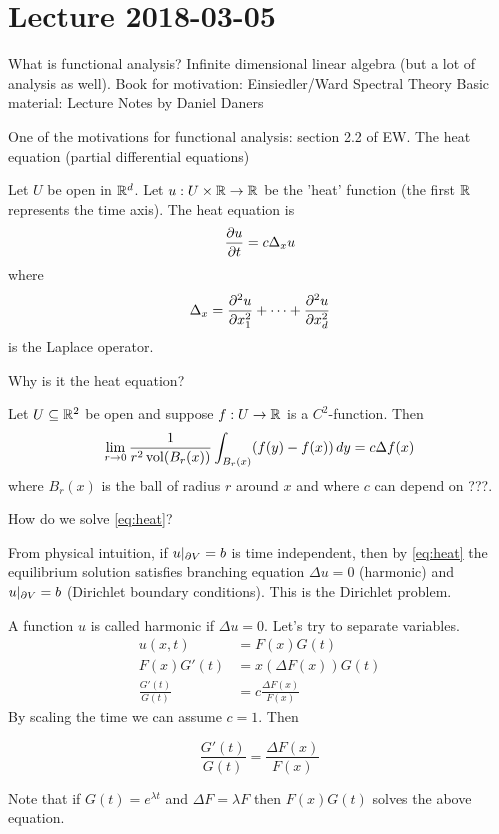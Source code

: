 \section{Lecture 2018-03-05}

What is functional analysis? Infinite dimensional linear algebra (but a lot of analysis as well).
Book for motivation: Einsiedler/Ward Spectral Theory
Basic material: Lecture Notes by Daniel Daners

One of the motivations for functional analysis: section 2.2 of EW.
The heat equation (partial differential equations)

\begin{defn}
	Let $U$ be open in $\mathbb{R}^d$.
	Let $u: U \times \mathbb{R} \to \mathbb{R}$ be the 'heat' function (the first $\mathbb{R}$ represents the time axis).
	The heat equation is
	\begin{equation}\label{eq:heat}
		\frac{\partial u}{\partial t} = c\Delta_x u
	\end{equation}
	where
	\[\Delta_x = \frac{\partial^2 u}{\partial x_1^2} + \cdots + \frac{\partial^2 u}{\partial x_d^2}\]
	is the Laplace operator.
\end{defn}

Why is it the heat equation?

\begin{prop}
	Let $U \subseteq \mathbb{R}^2$ be open and suppose $f: U \to \mathbb{R}$ is a $C^2$-function.
	Then
	\[\lim_{r \to 0} \frac{1}{r^2 \operatorname{vol}(B_r(x))} \int_{B_r(x)} (f(y)-f(x)) \, dy = c \Delta f(x)\]
	where $B_r(x)$ is the ball of radius $r$ around $x$ and where $c$ can depend on ???.
\end{prop}

How do we solve \cref{eq:heat}?

From physical intuition, if $u|_{\partial V}=b$ is time independent, then by \cref{eq:heat} the equilibrium solution satisfies
branching equation $\Delta u=0$ (harmonic) and $u|_{\partial V}=b$ (Dirichlet boundary conditions).
This is the Dirichlet problem.

A function $u$ is called harmonic if $\Delta u=0$.
Let's try to separate variables.
\begin{align*}
	u(x,t) &= F(x)G(t) \\
	F(x)G'(t) &= x(\Delta F(x))G(t) \\
	\frac{G'(t)}{G(t)} &= c \frac{\Delta F(x)}{F(x)}
\end{align*}
By scaling the time we can assume $c=1$.
Then

\[\frac{G'(t)}{G(t)} = \frac{\Delta F(x)}{F(x)}\]

Note that if $G(t) = e^{\lambda t}$ and $\Delta F = \lambda F$ then $F(x)G(t)$ solves the above equation.

